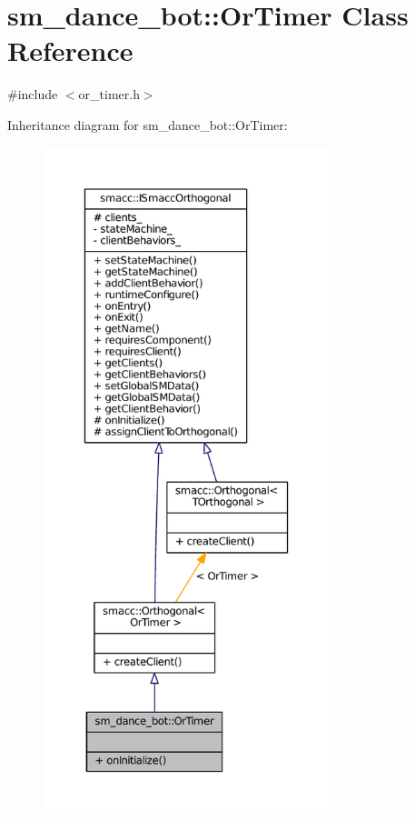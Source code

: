\hypertarget{classsm__dance__bot_1_1OrTimer}{}\section{sm\+\_\+dance\+\_\+bot\+:\+:Or\+Timer Class Reference}
\label{classsm__dance__bot_1_1OrTimer}


{\ttfamily \#include $<$or\+\_\+timer.\+h$>$}



Inheritance diagram for sm\+\_\+dance\+\_\+bot\+:\+:Or\+Timer\+:
\nopagebreak
\begin{figure}[H]
\begin{center}
\leavevmode
\includegraphics[height=550pt]{classsm__dance__bot_1_1OrTimer__inherit__graph}
\end{center}
\end{figure}


